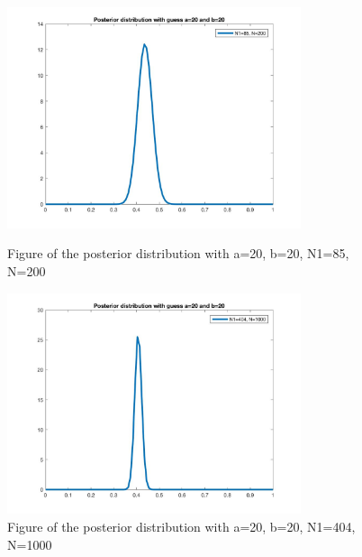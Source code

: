 \documentclass[a4paper]{article}
\begin{document}
\begin{spacing}{2.0}
\begin{enumerate}[(1)]
\begin{figure}[htbp]
\begin{minipage}[t]{0.5\linewidth}
\centering
\includegraphics[width=3.4in]{posterior2.jpg}
\caption{Figure of the posterior distribution with a=20, b=20, N1=85, N=200}
\label{posterior2}
\end{minipage}
\begin{minipage}[t]{0.5\linewidth}
\centering
\includegraphics[width=3.4in]{posterior3.jpg}
\caption{Figure of the posterior distribution with a=20, b=20, N1=404, N=1000}
\label{posterior3}
\end{minipage}
\end{figure}


\end{enumerate}
\end{spacing}
\end{document}
